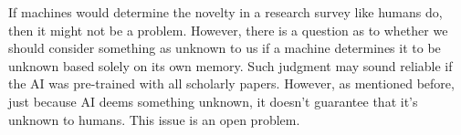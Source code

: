 


If machines would determine the novelty in a research survey like humans do, then it might not be a problem. However, there is a question as to whether we should consider something as unknown to us if a machine determines it to be unknown based solely on its own memory. Such judgment may sound reliable if the AI was pre-trained with all scholarly papers. However, as mentioned before, just because AI deems something unknown, it doesn't guarantee that it's unknown to humans. This issue is an open problem.


